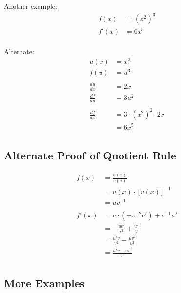 \documentclass[letterpaper, landscape]{exam}
\begin{document}
  Another example:
  \begin{align*}
    f(x)  & = \left( x^2 \right)^3 \\
    f'(x) & = 6x^5 \\
  \end{align*}

  Alternate:
  \begin{align*}
    u(x)          & = x^2 \\
    f(u)          & = u^3 \\
    \\
    \frac{du}{dx} & = 2x \\
    \frac{df}{du} & = 3u^2 \\
    \\
    \frac{df}{dx} & = 3 \cdot \left( x^2 \right)^2 \cdot 2x \\
                  & = 6x^5 \\
  \end{align*}

  \subsection{Alternate Proof of Quotient Rule} %
  
  \begin{align*}
    f(x)  & = \frac{u(x)}{v(x)} \\
          & = u(x) \cdot [ v(x) ]^{-1} \\
          & = uv^{-1} \\
    \\
    f'(x) & = u \cdot (- v^{-2} v') + v^{-1} u' \\
          & = - \frac{uv'}{v^2} + \frac{u'}{v} \\
          & = \frac{u'v}{v^2} - \frac{uv'}{v^2} \\
          & = \frac{u'v - uv'}{v^2} \\
  \end{align*}

  \subsection{More Examples} %
  
\end{document}
